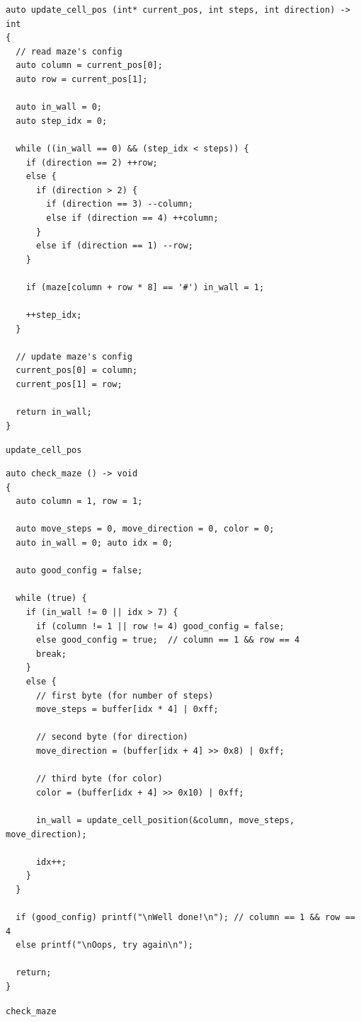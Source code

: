 \documentclass{easychair}
\begin{document}
\begin{listing}[ht]
  \begin{tcolorbox}
\begin{verbatim}
auto update_cell_pos (int* current_pos, int steps, int direction) -> int
{
  // read maze's config
  auto column = current_pos[0];
  auto row = current_pos[1];

  auto in_wall = 0;
  auto step_idx = 0;

  while ((in_wall == 0) && (step_idx < steps)) {
    if (direction == 2) ++row;
    else {
      if (direction > 2) {
        if (direction == 3) --column;
        else if (direction == 4) ++column;
      }
      else if (direction == 1) --row;
    }

    if (maze[column + row * 8] == '#') in_wall = 1;

    ++step_idx;
  }

  // update maze's config
  current_pos[0] = column;
  current_pos[1] = row;

  return in_wall;
}
\end{verbatim}
  \end{tcolorbox}
  \caption{\texttt{update\_cell\_pos}}
  \label{lst:update_cell_pos}
\end{listing}

\begin{listing}[ht]
  \begin{tcolorbox}
\begin{verbatim}
auto check_maze () -> void
{
  auto column = 1, row = 1;

  auto move_steps = 0, move_direction = 0, color = 0;
  auto in_wall = 0; auto idx = 0;

  auto good_config = false;

  while (true) {
    if (in_wall != 0 || idx > 7) {
      if (column != 1 || row != 4) good_config = false;
      else good_config = true;  // column == 1 && row == 4
      break;
    }
    else {
      // first byte (for number of steps)
      move_steps = buffer[idx * 4] | 0xff;

      // second byte (for direction)
      move_direction = (buffer[idx + 4] >> 0x8) | 0xff;

      // third byte (for color)
      color = (buffer[idx + 4] >> 0x10) | 0xff;

      in_wall = update_cell_position(&column, move_steps, move_direction);

      idx++;
    }
  }

  if (good_config) printf("\nWell done!\n"); // column == 1 && row == 4
  else printf("\nOops, try again\n");

  return;
}
\end{verbatim}
  \end{tcolorbox}
  \caption{\texttt{check\_maze}}
  \label{lst:check_maze}
\end{listing}

\printbibliography
\end{document}
